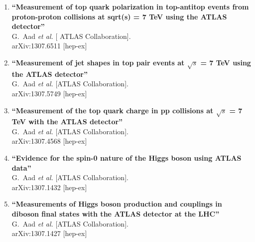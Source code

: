 \documentclass{article}
\begin{document}
\begin{enumerate}
\item%
{\bf ``Measurement of top quark polarization in top-antitop events from proton-proton collisions at sqrt(s) = 7 TeV using the ATLAS detector''}
  \\{}G.~Aad {\it et al.}  [ ATLAS Collaboration].
  \\{}arXiv:1307.6511 [hep-ex]
  


\item%
{\bf ``Measurement of jet shapes in top pair events at $\sqrt{s}$ = 7 TeV using the ATLAS detector''}
  \\{}G.~Aad {\it et al.}  [ATLAS Collaboration].
  \\{}arXiv:1307.5749 [hep-ex]
  



\item%
{\bf ``Measurement of the top quark charge in pp collisions at $\sqrt{s}$ = 7 TeV with the ATLAS detector''}
  \\{}G.~Aad {\it et al.}  [ATLAS Collaboration].
  \\{}arXiv:1307.4568 [hep-ex]
  



\item%
{\bf ``Evidence for the spin-0 nature of the Higgs boson using ATLAS data''}
  \\{}G.~Aad {\it et al.}  [ATLAS Collaboration].
  \\{}arXiv:1307.1432 [hep-ex]
  


\item%
{\bf ``Measurements of Higgs boson production and couplings in diboson final states with the ATLAS detector at the LHC''}
  \\{}G.~Aad {\it et al.}  [ATLAS Collaboration].
  \\{}arXiv:1307.1427 [hep-ex]
  

\end{enumerate}
\end{document}

